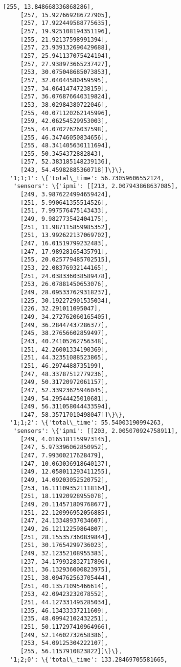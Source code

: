 \documentclass[11pt]{article}
\begin{document}
\begin{tcolorbox}[breakable, size=fbox, boxrule=.5pt, pad at break*=1mm, opacityfill=0]
\begin{Verbatim}[commandchars=\\\{\}]
     [255, 13.848668336868286],
     [257, 15.927669286727905],
     [257, 17.922449588775635],
     [257, 19.925108194351196],
     [255, 21.92137598991394],
     [257, 23.939132690429688],
     [257, 25.941137075424194],
     [257, 27.938973665237427],
     [253, 30.075048685073853],
     [257, 32.04044580459595],
     [257, 34.06414747238159],
     [257, 36.076876640319824],
     [253, 38.02984380722046],
     [255, 40.071120262145996],
     [259, 42.06254529953003],
     [255, 44.07027626037598],
     [255, 46.34746050834656],
     [255, 48.341405630111694],
     [255, 50.3454372882843],
     [257, 52.383185148239136],
     [243, 54.45982885360718]]\}\},
  '1;1;1': \{'total\_time': 56.73059606552124,
   'sensors': \{'ipmi': [[213, 2.007943868637085],
     [249, 3.9876224994659424],
     [251, 5.990641355514526],
     [251, 7.997576475143433],
     [249, 9.982773542404175],
     [251, 11.987115859985352],
     [251, 13.992622137069702],
     [247, 16.01519799232483],
     [247, 17.98928165435791],
     [255, 20.025779485702515],
     [253, 22.08376932144165],
     [251, 24.038336038589478],
     [253, 26.07881450653076],
     [249, 28.095337629318237],
     [225, 30.192272901535034],
     [226, 32.291011095047],
     [249, 34.272762060165405],
     [249, 36.28447437286377],
     [245, 38.27656602859497],
     [243, 40.24105262756348],
     [251, 42.26001334190369],
     [251, 44.32351088523865],
     [251, 46.2974488735199],
     [247, 48.33787512779236],
     [249, 50.31720972061157],
     [247, 52.33923625946045],
     [249, 54.29544425010681],
     [249, 56.311058044433594],
     [247, 58.35717010498047]]\}\},
  '1;1;2': \{'total\_time': 55.54003190994263,
   'sensors': \{'ipmi': [[203, 2.005070924758911],
     [249, 4.0165181159973145],
     [247, 5.973396062850952],
     [247, 7.99300217628479],
     [247, 10.063036918640137],
     [249, 12.058011293411255],
     [249, 14.09203052520752],
     [253, 16.111093521118164],
     [251, 18.11920928955078],
     [249, 20.114571809768677],
     [251, 22.120996952056885],
     [247, 24.13348937034607],
     [249, 26.12112259864807],
     [251, 28.155357360839844],
     [251, 30.17654299736023],
     [249, 32.12352108955383],
     [237, 34.179932832717896],
     [231, 36.132936000823975],
     [251, 38.094762563705444],
     [251, 40.13571095466614],
     [253, 42.09423232078552],
     [251, 44.127331495285034],
     [235, 46.13433337211609],
     [235, 48.09942102432251],
     [251, 50.117297410964966],
     [249, 52.14602732658386],
     [253, 54.09125304222107],
     [255, 56.1157910823822]]\}\},
  '1;2;0': \{'total\_time': 133.28469705581665,

\end{Verbatim}
\end{tcolorbox}
\end{document}
